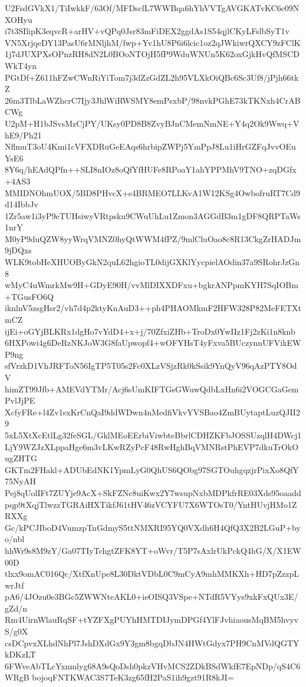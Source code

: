 U2FsdGVkX1/TiIwkkF/63Of/MFDsclL7WWBqa6hYhVVTgAVGKATvKC6c09NXOHyu
i7t3SIlipK3eqvcR+arHV+vQPq0Jsr83mFiDEX2ggdAs1S54qjlCKyLFslbSyT1v
VN5XrjqeDY13PasU6rMNljhM/fwp+Yv1hU8P6i6lcic1oz2qJWkiwrQXCY9zFClK
1j7dJUXPXsOPnzRH8dN2L0BOoNTOjH5fP9WduWNUn5K62oxGjkHvQfMSCDWkT4yn
PGtDf+Z611hFZwCWnRiYiTom7j3dZzGdZL2h95VLXkOiQBc6Sc3Uf8/jPjh66tkZ
26m3TlbLaWZhcrC7Ijy3JhlWiRWSMY8emPsxbP/98nvkPGhE73kTKNxh4CrABCWg
U2pM+H1bJSvsMzCjPY/UKsy0PD8B8ZvyBJnCMemNmNE+Y4q2Ok9Wwq+VhE9/Ph21
NflmuT3oU4Kmi1cVFXDRuGeEAqs6hrbipZWPj5YmPpJ8Lu1iHrGZFqJvvOEuYsE6
8Y6q/hEAdQPfn++SLI8nIOz8oQfYfHUFe8RPoaY1ahYPPMhV9TNO+zqDGfx+4AS3
MMIDNOhmUOX/5BD8PHvcX+s4BRMEO7LLKvA1W12KSg4OwbofruRT7Cd9d14IbbJv
1Zr5aw1i3yP9eTUHsiwyVRtpsku9CWuUhLu1Zmon3AGGdB3m1gDF8QRPTaWs1nrY
M0yP9duQZW8yyWrqVMNZ0hyQtWWM4fPZ/9mlCluOao8c8R13CkgZrHADJm9jDQxs
WLK9tobHeXHUOByGkN2quL62hgioTL0dijGXKlYycpielAOdin37a9SRohrJzGn8
wMyC4uWmrkMw9H+GDyE90H/vvMlDIXXDFxu+bgkrANPpmKYH7SqIOBm+TGusFO6Q
iknlnV5zsgHsr2/vh7d4p2ktyKnAuD3++ph4PHAOMkmF2HFW328P82MeFETXtmCZ
ijEi+oGYjBLKRx1dgHo7vYdD4+x+j/70ZfxiZHb+TroDx0YwIIz1Fj2zKi1n8knb
6HXPowi4g6DeRzNKJoW3G8faUpwopf4+wOFYHsT4yFxva5BUczynnUFVikEWP9ng
sfVrzkD1VhJRFToN56IgTP5T05s2Fc0XLzVSjzRk0kSsik9YnQyV96qAzPTY8OdV
himZT99Jfb+AMEVdYTMr/Acj6sUmKIFTGsGWuwQdbLxHn6i2VOGCGaGemPvlJjPE
XcfyFRe+l4Zv1sxKrCnQaI9ddWDwn4nMedfiVkvYVSBao4ZmBUytaptLuzQJII29
5xL5XtXcEtlLg32feSGL/GklMEoEErbiViwbteBbrlCDHZKFbJOSSUzqlH4DWcj1
LjY9WZJzXLppaHge6m3vLKwRZyPcF48RwHghBqVMNRstPhEVP7dkuTrOkOugZHTG
GKTm2FHakl+ADUbEdNK1YpmLyG0QhUS6QObg97SGTOuhgqzjrPixXo8QfY75NyAH
Pej8qUolIFt7ZUYje9AcX+SkFZNc8uiKwx2Y7wsupNxbMDPkfrRE03Xds95oaadd
pqp9tXqjTlwzzTGRAiHXTikfJ61tHV46zVCYFU7X6WTOsT0/YntHUvjHMo1ZRXXg
Gc/kPCJIboD4VumzpTnGdmyS5ttNMXRI95YQ0VXdh6H4QfQ3X2B2LGuP+byo/nbl
hhWr9s8M9zY/Ga07TIyTchgtZFK8YT+oWvr/T5P7sAxlrUkPckQ4hG/X/X1EW00D
tlxx9omAC016Qc/XtfXnUpe8L30DktVDbL0C9mCyA9mhMMKXh+HD7pZzzpLwrJtf
pA6/4JOzu0e3BGc5ZWWNteAKL0+ieOISQ3VSpe+NTdR5VYys9xkFxQUx3E/gZd/n
Rm4UirnWlauRqSF+tYZFXgPUYhHMTDIJymDPGf4YlFJvhiaousMqBM5hvyvS/g0X
csDCpvxXLhdNhPl7JshDXdGx9Y3gm8bgqDbJN4HWtGdyx7PH9CnMVdQGTYkDKzLT
6FWveAbTLcYxnmlyg68A9sQoDsh0pkzVHvMCS2ZDkBSdWkfE7EpNDp/qS4C6WRgB
bojoqFNTKWAC3S7TeK3zg65fH2PaS1ih9gzt91R8kJI=
